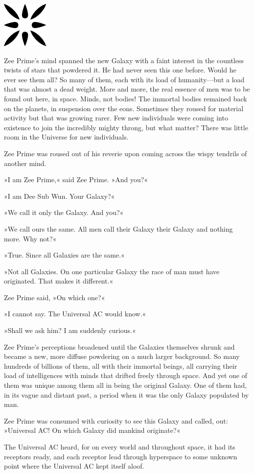 \documentclass[11pt,twocolumn,paper=a5,pagesize,twoside]{scrartcl}
\newcommand{\q}[1]{»#1«}
\newcommand{\futurethree}[1]{ #1 }
\newcommand{\sepc}[0]{\vspace{.4cm} {\centering 

\includegraphics[scale=0.8]{blackor/o9.pdf}

}\vspace{.4cm}}
\newcommand{\initial}[1]{ \lettrine[lines=3,lhang=0.3,nindent=0em]{  {\textsf{#1}}}{}}
\begin{document}
\sepc{}

\futurethree{
\initial{Z}ee Prime's mind spanned the new Galaxy with a faint interest in the 
countless twists of stars that powdered it. He had never seen this one before. 
Would he ever see them all? So many of them, each with its load of 
humanity---but a load that was almost a dead weight. More and more, the real 
essence of men was to be found out here, in space.
Minds, not bodies! The immortal bodies remained back on the planets, in 
suspension over the eons. Sometimes they roused for material activity but that 
was growing rarer. Few new individuals were coming into existence to join the 
incredibly mighty throng, but what matter? There was little room in the 
Universe for new individuals.

Zee Prime was roused out of his reverie upon coming across the wispy tendrils 
of another mind.

\q{I am Zee Prime,} said Zee Prime. \q{And you?}

\q{I am Dee Sub Wun. Your Galaxy?}

\q{We call it only the Galaxy. And you?}

\q{We call ours the same. All men call their Galaxy their Galaxy and nothing 
more. Why not?}

\q{True. Since all Galaxies are the same.}

\q{Not all Galaxies. On one particular Galaxy the race of man must have 
originated. That makes it different.}

Zee Prime said, \q{On which one?}

\q{I cannot say. The Universal AC would know.}

\q{Shall we ask him? I am suddenly curious.}

Zee Prime's perceptions broadened until the Galaxies themselves shrunk and 
became a new, more diffuse powdering on a much larger background. So many 
hundreds of billions of them, all with their immortal beings, all carrying 
their load of intelligences with minds that drifted freely through space. 
And yet one of them was unique among them all in being the original 
Galaxy. One of them had, in its vague and distant past, a period when it 
was the only Galaxy populated by man.

Zee Prime was consumed with curiosity to see this Galaxy and called, out: 
\q{Universal AC! On which Galaxy did mankind originate?}

The Universal AC heard, for on every world and throughout space, it had its 
receptors ready, and each receptor lead through hyperspace to some unknown 
point where the Universal AC kept itself aloof.

}
\end{document}
